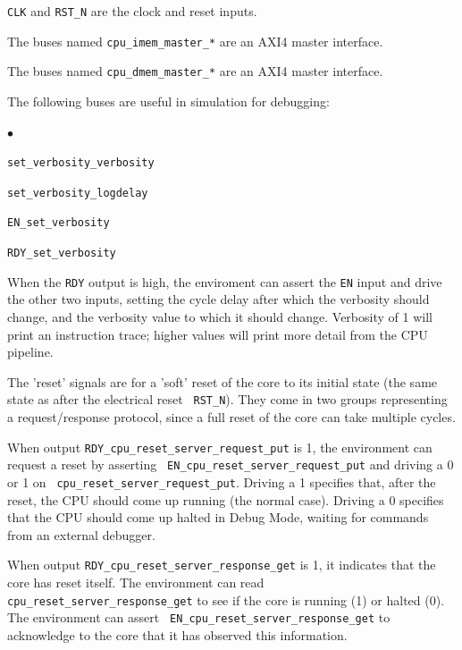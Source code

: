 \documentclass[11pt]{book}
\newenvironment{tightlist}%
{\begin{list}{$\bullet$}{%
    \setlength{\topsep}{0in}
    \setlength{\partopsep}{0in}
    \setlength{\itemsep}{0in}
    \setlength{\parsep}{0in}
    \setlength{\leftmargin}{1.5em}
    \setlength{\rightmargin}{0in}
    \setlength{\itemindent}{0in}
}
}%
{\end{list}
}
\newcommand{\cf}{\footnotesize\tt}
\begin{document}
\begin{itemize}

\item {\cf CLK} and {\cf RST\_N} are the clock and reset inputs.

\item The buses named {\cf cpu\_imem\_master\_*} are an AXI4 master interface.

\item The buses named {\cf cpu\_dmem\_master\_*} are an AXI4 master interface.

\item The following buses are useful in simulation for debugging:
  \begin{tightlist}
    \item {\cf set\_verbosity\_verbosity}
    \item {\cf set\_verbosity\_logdelay}
    \item {\cf EN\_set\_verbosity}
    \item {\cf RDY\_set\_verbosity}
  \end{tightlist}
  When the {\cf RDY} output is high, the enviroment can assert the
  {\cf EN} input and drive the other two inputs, setting the cycle
  delay after which the verbosity should change, and the verbosity
  value to which it should change.  Verbosity of 1 will print an
  instruction trace; higher values will print more detail from the CPU
  pipeline.

\item The 'reset' signals are for a 'soft' reset of the core to its
  initial state (the same state as after the electrical reset {\cf
  RST\_N}).  They come in two groups representing a request/response
  protocol, since a full reset of the core can take multiple cycles.

  When output {\cf RDY\_cpu\_reset\_server\_request\_put} is 1, the
  environment can request a reset by asserting {\cf
  EN\_cpu\_reset\_server\_request\_put} and driving a 0 or 1 on {\cf
  cpu\_reset\_server\_request\_put}.  Driving a 1 specifies that,
  after the reset, the CPU should come up running (the normal case).
  Driving a 0 specifies that the CPU should come up halted in Debug
  Mode, waiting for commands from an external debugger.

  When output {\cf RDY\_cpu\_reset\_server\_response\_get} is 1, it
  indicates that the core has reset itself.  The environment can read {\cf
  cpu\_reset\_server\_response\_get} to see if the core is running (1)
  or halted (0).  The environment can assert {\cf
  EN\_cpu\_reset\_server\_response\_get} to acknowledge to the core
  that it has observed this information.


\end{itemize}
\end{document}
